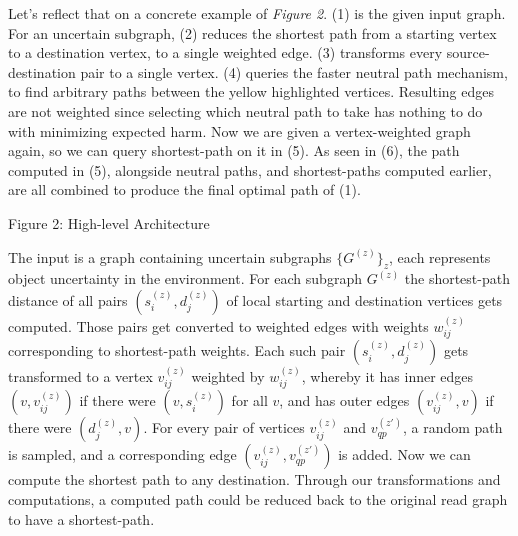 \documentclass[pdflatex,sn-mathphys-num]{sn-jnl}%
\begin{document}
Let's reflect that on a concrete example of \textit{Figure 2}. (1) is the given input graph. For an uncertain subgraph, (2) reduces the shortest path from a starting vertex to a destination vertex, to a single weighted edge. (3) transforms every source-destination pair to a single vertex. (4) queries the faster neutral path mechanism, to find arbitrary paths between the yellow highlighted vertices. Resulting edges are not weighted since selecting which neutral path to take has nothing to do with minimizing expected harm. Now we are given a vertex-weighted graph again, so we can query shortest-path on it in (5). As seen in (6), the path computed in (5), alongside neutral paths, and shortest-paths computed earlier, are all combined to produce the final optimal path of (1).

\begin{center}
  
  Figure 2: High-level Architecture
\end{center}

The input is a graph containing uncertain subgraphs $\{G^{(z)}\}_z$, each represents object uncertainty in the environment. For each subgraph $G^{(z)}$ the shortest-path distance of all pairs $(s_i^{(z)}, d_j^{(z)})$ of local starting and destination vertices gets computed. Those pairs get converted to weighted edges with weights $w_{ij}^{(z)}$ corresponding to shortest-path weights. Each such pair $(s_i^{(z)}, d_j^{(z)})$ gets transformed to a vertex $v_{ij}^{(z)}$ weighted by $w_{ij}^{(z)}$, whereby it has inner edges $(v, v_{ij}^{(z)})$ if there were $(v, s_i^{(z)})$ for all $v$, and has outer edges $(v_{ij}^{(z)}, v)$ if there were $(d_j^{(z)}, v)$. For every pair of vertices $v_{ij}^{(z)}$ and $v_{qp}^{(z')}$, a random path is sampled, and a corresponding edge $(v_{ij}^{(z)}, v_{qp}^{(z')})$ is added. Now we can compute the shortest path to any destination. Through our transformations and computations, a computed path could be reduced back to the original read graph to have a shortest-path.
\end{document}
